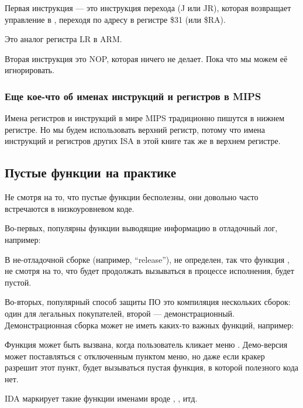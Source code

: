 Первая инструкция --- это инструкция перехода (J или JR),
которая возвращает управление в , переходя по адресу в регистре \$31 (или \$RA).

Это аналог регистра \ac{LR} в ARM.

Вторая инструкция это \ac{NOP}, которая ничего не делает.
Пока что мы можем её игнорировать.

\subsubsection{Еще кое-что об именах инструкций и регистров в MIPS}
Имена регистров и инструкций в мире MIPS традиционно пишутся в нижнем регистре.
Но мы будем использовать верхний регистр, потому что имена инструкций и регистров других
\ac{ISA} в этой книге так же в верхнем регистре.

\subsection{Пустые функции на практике}

Не смотря на то, что пустые функции бесполезны, они довольно часто встречаются в низкоуровневом коде.

Во-первых, популярны функции выводящие информацию в отладочный лог, например:



В не-отладочной сборке (например, ``release''),  не определен, так что функция ,
не смотря на то, что будет продолжать вызываться в процессе исполнения, будет пустой.

Во-вторых, популярный способ защиты ПО это компиляция нескольких сборок: один для легальных покупателей,
второй --- демонстрационный.
Демонстрационная сборка может не иметь каких-то важных функций, например:



Функция  может быть вызвана, когда пользователь кликает меню .
Демо-версия может поставляться с отключенным пунктом меню, но даже если кракер разрешит этот пункт,
будет вызываться пустая функция, в которой полезного кода нет.

IDA маркирует такие функции именами вроде , , итд.

